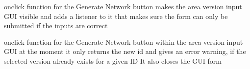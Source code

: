 \documentclass[letterpaper,10pt,english]{sphinxmanual}
\begin{document}

\begin{fulllineitems}
\label{\detokenize{docs_gui/js_api/postcode_editor/display_postcode:openAreaPopup}}
\pysigstartsignatures
{}
\pysigstopsignatures
\sphinxAtStartPar
onclick function for the Generate Network button
makes the area version input GUI visible and adds a listener to it that makes sure the form can only be submitted if the inputs are correct

\end{fulllineitems}


\begin{fulllineitems}
\label{\detokenize{docs_gui/js_api/postcode_editor/display_postcode:returnSelectedBuildings}}
\pysigstartsignatures
{}
\pysigstopsignatures
\sphinxAtStartPar
onclick function for the Generate Network button within the area version input GUI
at the moment it only returns the new id and gives an error warning, if the selected version already exists for a given ID
It also closes the GUI form

\end{fulllineitems}

\end{document}
